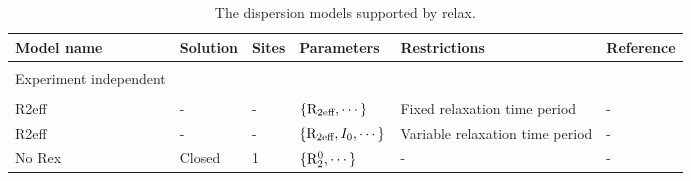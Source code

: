 \latex{\begin{landscape}}
\begin{center}
\begin{small}

\begin{longtable}{llllll}

\caption[The dispersion models.]{The dispersion models supported by relax.}

\\
\toprule
Model name               & Solution & Sites & Parameters                                          & Restrictions                      & Reference \\
\midrule
\endhead

\bottomrule
\endfoot

\label{table: dispersion models}

\\[-5pt]
Experiment independent \\
\cline{1-1}
\\[-5pt]
R2eff                    & -        & -     & $\{\mathrm{R}_{\textrm{2eff}}, \cdots\}$                              & Fixed relaxation time period      & - \\
R2eff                    & -        & -     & $\{\mathrm{R}_{\textrm{2eff}}, I_0, \cdots\}$                         & Variable relaxation time period   & - \\
No Rex                   & Closed   & 1     & $\{\mathrm{R}_2^0, \cdots\}$                             & -                                 & - \\


\end{longtable}
\end{small}
\end{center}
